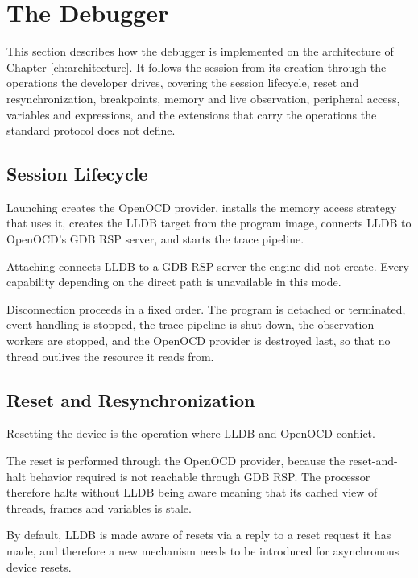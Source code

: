 \section{The Debugger}
\label{sec:debugger_impl}

This section describes how the debugger is implemented on the architecture of Chapter \ref{ch:architecture}. It follows the session from its creation through the operations the developer drives, covering the session lifecycle, reset and resynchronization, breakpoints, memory and live observation, peripheral access, variables and expressions, and the extensions that carry the operations the standard protocol does not define.

\subsection{Session Lifecycle}

Launching creates the OpenOCD provider, installs the memory access strategy that uses it, creates the LLDB target from the program image, connects LLDB to OpenOCD's GDB RSP server, and starts the trace pipeline.

Attaching connects LLDB to a GDB RSP server the engine did not create. Every capability depending on the direct path is unavailable in this mode.

Disconnection proceeds in a fixed order. The program is detached or terminated, event handling is stopped, the trace pipeline is shut down, the observation workers are stopped, and the OpenOCD provider is destroyed last, so that no thread outlives the resource it reads from.


\subsection{Reset and Resynchronization}
\label{subsec:reset_impl}

Resetting the device is the operation where LLDB and OpenOCD conflict.

The reset is performed through the OpenOCD provider, because the reset-and-halt behavior required is not reachable through GDB RSP. The processor therefore halts without LLDB being aware meaning that its cached view of threads, frames and variables is stale.

By default, LLDB is made aware of resets via a reply to a reset request it has made, and therefore a new mechanism needs to be introduced for asynchronous device resets.

